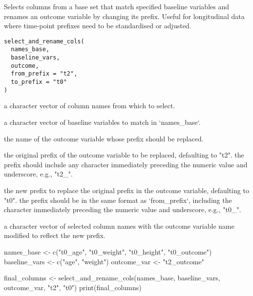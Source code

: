 \documentclass[a4paper]{book}
\begin{document}
%
\begin{Description}
Selects columns from a base set that match specified baseline variables and renames
an outcome variable by changing its prefix. Useful for longitudinal data where
time-point prefixes need to be standardised or adjusted.
\end{Description}
%
\begin{Usage}
\begin{verbatim}
select_and_rename_cols(
  names_base,
  baseline_vars,
  outcome,
  from_prefix = "t2",
  to_prefix = "t0"
)
\end{verbatim}
\end{Usage}
%
\begin{Arguments}
\begin{ldescription}
\item[\code{names\_base}] a character vector of column names from which to select.

\item[\code{baseline\_vars}] a character vector of baseline variables to match in `names\_base`.

\item[\code{outcome}] the name of the outcome variable whose prefix should be replaced.

\item[\code{from\_prefix}] the original prefix of the outcome variable to be replaced,
defaulting to "t2". the prefix should include any character immediately
preceding the numeric value and underscore, e.g., "t2\_".

\item[\code{to\_prefix}] the new prefix to replace the original prefix in the outcome
variable, defaulting to "t0". the prefix should be in the same format as
`from\_prefix`, including the character immediately preceding the numeric value
and underscore, e.g., "t0\_".
\end{ldescription}
\end{Arguments}
%
\begin{Value}
a character vector of selected column names with the outcome variable name
modified to reflect the new prefix.
\end{Value}
%
\begin{Examples}
\begin{ExampleCode}
names_base <- c("t0_age", "t0_weight", "t0_height", "t0_outcome")
baseline_vars <- c("age", "weight")
outcome_var <- "t2_outcome"

final_columns <- select_and_rename_cols(names_base, baseline_vars, outcome_var, "t2", "t0")
print(final_columns)

\end{ExampleCode}
\end{Examples}
\end{document}
